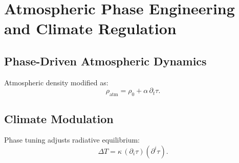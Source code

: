 \chapter{Atmospheric Phase Engineering and Climate Regulation}

\section{Phase-Driven Atmospheric Dynamics}
Atmospheric density modified as:
\[
\rho_{\mathrm{atm}} = \rho_0 + \alpha\,\partial_t\tau.
\]

\section{Climate Modulation}
Phase tuning adjusts radiative equilibrium:
\[
\Delta T = \kappa\,(\partial_i \tau)(\partial^i \tau).
\]

